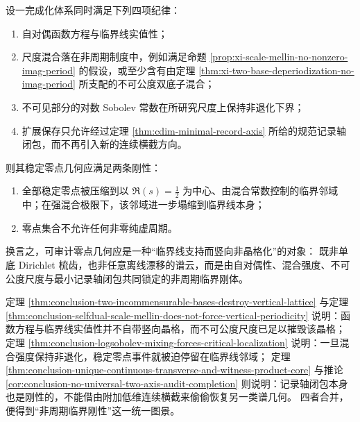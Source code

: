 \begin{conjecture}[自对偶多尺度审计的非周期临界刚性]\label{conj:conclusion-aperiodic-critical-rigidity}
设一完成化体系同时满足下列四项纪律：
\begin{enumerate}
  \item 自对偶函数方程与临界线实值性；
  \item 尺度混合落在非周期制度中，例如满足命题 \ref{prop:xi-scale-mellin-no-nonzero-imag-period} 的假设，或至少含有由定理 \ref{thm:xi-two-base-deperiodization-no-imag-period} 所支配的不可公度双底子混合；
  \item 不可见部分的对数 Sobolev 常数在所研究尺度上保持非退化下界；
  \item 扩展保存只允许经过定理 \ref{thm:cdim-minimal-record-axis} 所给的规范记录轴闭包，而不再引入新的连续横截方向。
\end{enumerate}
则其稳定零点几何应满足两条刚性：
\begin{enumerate}
  \item 全部稳定零点被压缩到以 \(\Re(s)=\frac12\) 为中心、由混合常数控制的临界邻域中；在强混合极限下，该邻域进一步塌缩到临界线本身；
  \item 零点集合不允许任何非零纯虚周期。
\end{enumerate}
换言之，可审计零点几何应是一种“临界线支持而竖向非晶格化”的对象：
既非单底 Dirichlet 梳齿，也非任意离线漂移的谱云，而是由自对偶性、混合强度、不可公度尺度与最小记录轴闭包共同锁定的非周期临界刚体。
\end{conjecture}

\begin{remark}[结构论据]\label{rem:conclusion-aperiodic-critical-rigidity-evidence}
定理 \ref{thm:conclusion-two-incommensurable-bases-destroy-vertical-lattice} 与定理 \ref{thm:conclusion-selfdual-scale-mellin-does-not-force-vertical-periodicity} 说明：函数方程与临界线实值性并不自带竖向晶格，而不可公度尺度已足以摧毁该晶格；
定理 \ref{thm:conclusion-logsobolev-mixing-forces-critical-localization} 说明：一旦混合强度保持非退化，稳定零点事件就被迫停留在临界线邻域；
定理 \ref{thm:conclusion-unique-continuous-transverse-and-witness-product-core} 与推论 \ref{cor:conclusion-no-universal-two-axis-audit-completion} 则说明：记录轴闭包本身也是刚性的，不能借由附加低维连续横截来偷偷恢复另一类谱几何。
四者合并，便得到“非周期临界刚性”这一统一图景。
\end{remark}

\endinput
